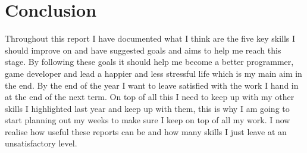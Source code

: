\documentclass{scrartcl}
\begin{document}
\section*{Conclusion}
Throughout this report I have documented what I think are the five key skills I should improve on and have suggested goals and aims to help me reach this stage. By following these goals it should help me become a better programmer, game developer and lead a happier and less stressful life which is my main aim in the end. By the end of the year I want to leave satisfied with the work I hand in at the end of the next term. On top of all this I need to keep up with my other skills I highlighted last year and keep up with them, this is why I am going to start planning out my weeks to make sure I keep on top of all my work. I now realise how useful these reports can be and how many skills I just leave at an unsatisfactory level.




\end{document}
